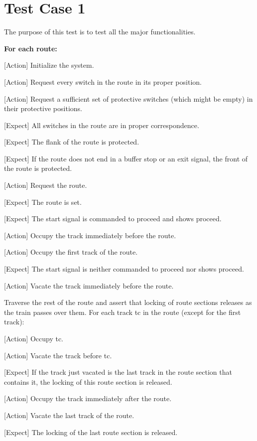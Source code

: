 \documentclass[10pt,a4paper]{article}
\begin{document}
\vspace{9mm}
\section{Test Case 1}
The purpose of this test is to test all the major functionalities.

\begin{procedurebox}
  \textbf{For each route:}
  \begin{teststeps}
    \item \textnormal{[Action]} Initialize the system.
    \item \textnormal{[Action]} Request every switch in the route in its proper position.
    \item \textnormal{[Action]} Request a sufficient set of protective switches (which might be empty) in their protective positions.
    \item \textnormal{[Expect]} All switches in the route are in proper correspondence.
    \item \textnormal{[Expect]} The flank of the route is protected.
    \item \textnormal{[Expect]} If the route does not end in a buffer stop or an exit signal, the front of the route is protected.
    \item \textnormal{[Action]} Request the route.
    \item \textnormal{[Expect]} The route is set.
    \item \textnormal{[Expect]} The start signal is commanded to proceed and shows proceed.
    \item \textnormal{[Action]} Occupy the track immediately before the route.
    \item \textnormal{[Action]} Occupy the first track of the route.
    \item \textnormal{[Expect]} The start signal is neither commanded to proceed nor shows proceed.
    \item \textnormal{[Action]} Vacate the track immediately before the route.
    \item Traverse the rest of the route and assert that locking of route sections releases as the train passes over them.
      For each track tc in the route (except for the first track):
      \begin{substeps}
        \item \textnormal{[Action]} Occupy tc.
        \item \textnormal{[Action]} Vacate the track before tc.
        \item \textnormal{[Expect]} If the track just vacated is the last track in the route section that contains it, the locking of this route section is released.
      \end{substeps}
    \item \textnormal{[Action]} Occupy the track immediately after the route.
    \item \textnormal{[Action]} Vacate the last track of the route.
    \item \textnormal{[Expect]} The locking of the last route section is released.
  \end{teststeps}
\end{procedurebox}
\end{document}
